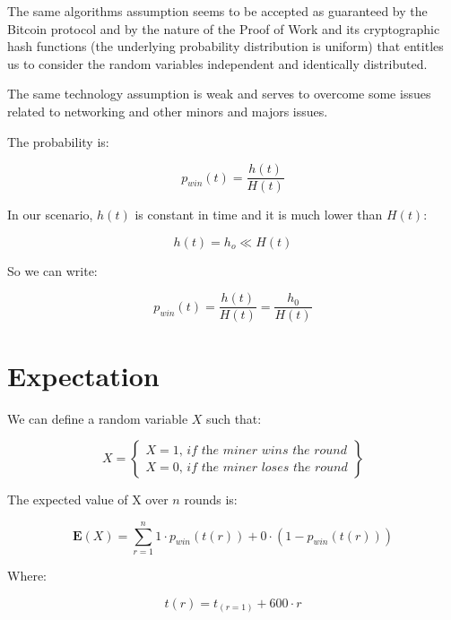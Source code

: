 \documentclass{book}
\theoremstyle{definition}
\begin{document}
The same algorithms assumption seems to be accepted as guaranteed by the Bitcoin protocol and by the nature of the Proof of Work and its cryptographic hash functions (the underlying probability distribution is uniform) that entitles us to consider the random variables independent and identically distributed.

The same technology assumption is weak and serves to overcome some issues related to networking and other minors and majors issues.

The probability is:

\begin{equation}
    p_{win}(t) = \frac{h(t)}{H(t)} \label{eq2}
\end{equation}

In our scenario, $h(t)$ is constant in time and it is much lower than $H(t)$: 

\begin{equation}
    h(t) = h_{o} \ll H(t) \label{eq3}
\end{equation}

So we can write:

\begin{equation}
    p_{win}(t) = \frac{h(t)}{H(t)} = \frac{h_{0}}{H(t)} \label{eq4}
\end{equation}

\section{Expectation}

We can define a random variable $X$ such that:

\begin{equation}
X = \left\{
        \begin{array}{ll}
            X = 1 \textit{, if the miner wins the round} \\
            X = 0 \textit{, if the miner loses the round}
        \end{array}
    \right \} \label{rndX}
\end{equation}

The expected value of X over $n$ rounds is:

\begin{equation}
    \mathbf{E}(X) = \displaystyle\sum_{r=1}^{n} 1 \cdot p_{win}(t(r)) + 0 \cdot ( 1 - p_{win}(t(r))) \label{eq5}
\end{equation}

Where:

\begin{equation}
    t(r) = t_{(r=1)} + 600 \cdot r \label{eq6}
\end{equation}
\end{document}
